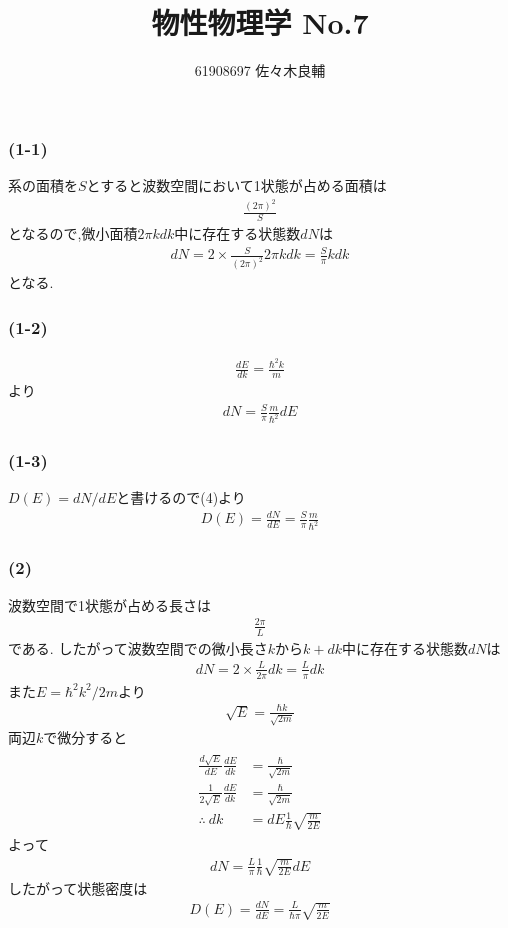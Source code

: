 \documentclass[uplatex,a4j,11pt,dvipdfmx]{jsarticle}
\begin{document}
\title{物性物理学 No.7}
\author{61908697 佐々木良輔}
\date{}
\maketitle
\subsubsection*{(1-1)}
系の面積を$S$とすると波数空間において1状態が占める面積は
\begin{align}
  \frac{(2\pi)^2}{S}
\end{align}
となるので,微小面積$2\pi kdk$中に存在する状態数$dN$は
\begin{align}
  dN=2\times\frac{S}{(2\pi)^2}2\pi kdk=\frac{S}{\pi}kdk
\end{align}
となる.
\subsubsection*{(1-2)}
\begin{align}
  \frac{dE}{dk}=\frac{\hbar^2 k}{m}
\end{align}
より
\begin{align}
  dN=\frac{S}{\pi}\frac{m}{\hbar^2}dE
\end{align}
\subsubsection*{(1-3)}
$D(E)=dN/dE$と書けるので(4)より
\begin{align}
  D(E)=\frac{dN}{dE}=\frac{S}{\pi}\frac{m}{\hbar^2}
\end{align}
\subsubsection*{(2)}
波数空間で1状態が占める長さは
\begin{align}
  \frac{2\pi}{L}
\end{align}
である.
したがって波数空間での微小長さ$k$から$k+dk$中に存在する状態数$dN$は
\begin{align}
  dN=2\times\frac{L}{2\pi}dk=\frac{L}{\pi}dk
\end{align}
また$E=\hbar^2k^2/2m$より
\begin{align}
  \sqrt{E}=\frac{\hbar k}{\sqrt{2m}}
\end{align}
両辺$k$で微分すると
\begin{align}
  \begin{split}
    \frac{d\sqrt{E}}{dE}\frac{dE}{dk}&=\frac{\hbar}{\sqrt{2m}}\\
    \frac{1}{2\sqrt{E}}\frac{dE}{dk}&=\frac{\hbar}{\sqrt{2m}}\\
    \therefore\ dk&=dE\frac{1}{\hbar}\sqrt{\frac{m}{2E}}
  \end{split}
\end{align}
よって
\begin{align}
  dN=\frac{L}{\pi}\frac{1}{\hbar}\sqrt{\frac{m}{2E}}dE
\end{align}
したがって状態密度は
\begin{align}
  D(E)=\frac{dN}{dE}=\frac{L}{\hbar\pi}\sqrt{\frac{m}{2E}}
\end{align}
\end{document}
